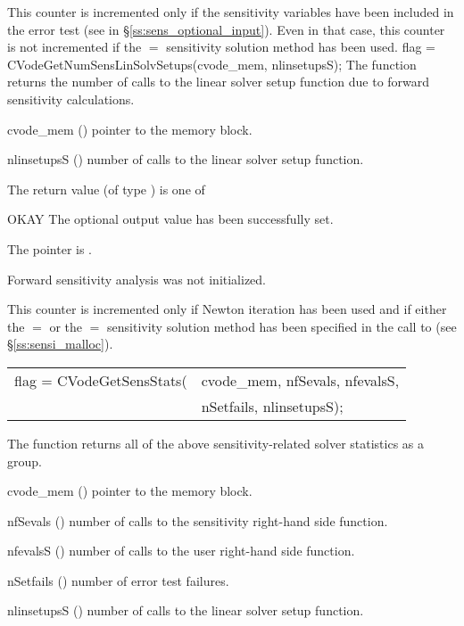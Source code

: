 {
  This counter is incremented only if the sensitivity variables have been included
  in the error test (see  in \S\ref{ss:sens_optional_input}). 
  Even in that case, this counter is not incremented if the $=$ 
  sensitivity solution method has been used.
}
{
  flag = CVodeGetNumSensLinSolvSetups(cvode\_mem, nlinsetupsS);
}
{
  The function  returns the number of calls
  to the linear solver setup function due to forward sensitivity calculations.
}
{
  \begin{args}
  \item[cvode\_mem] ()
    pointer to the {\cvodes} memory block.
  \item[nlinsetupsS] ()
    number of calls to the linear solver setup function.
  \end{args}
}
{
  The return value  (of type ) is one of
  \begin{args}
  \item[OKAY] 
    The optional output value has been successfully set.
  \item[\Id{CVG\_NO\_MEM}]
    The  pointer is .
  \item[\Id{CVG\_NO\_SENS}]
    Forward sensitivity analysis was not initialized.
  \end{args}
}
{
  This counter is incremented only if Newton iteration has been used and if
  either the $=$ or the $=$ sensitivity
  solution method has been specified in the call to 
  (see \S\ref{ss:sensi_malloc}).
}
{
  \begin{tabular}[t]{@{}r@{}l@{}}
    flag = CVodeGetSensStats(&cvode\_mem, nfSevals, nfevalsS, \\
                             &nSetfails, nlinsetupsS);
  \end{tabular}
}
{
  The function  returns all of the above sensitivity-related solver
  statistics as a group.
}
{
  \begin{args}
  \item[cvode\_mem] ()
    pointer to the {\cvodes} memory block.
  \item[nfSevals] ()
    number of calls to the sensitivity right-hand side function.
  \item[nfevalsS] ()
    number of calls to the user right-hand side function.
  \item[nSetfails] ()
    number of error test failures.
  \item[nlinsetupsS] ()
    number of calls to the linear solver setup function.
  \end{args}
}
